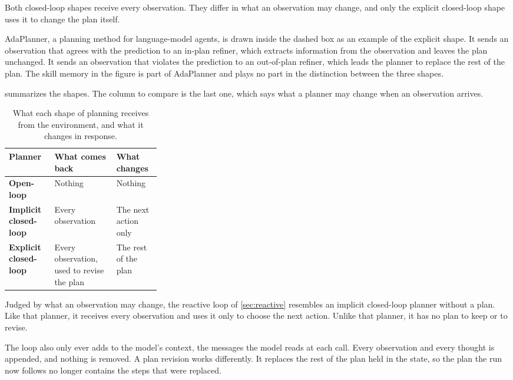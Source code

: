 Both closed-loop shapes receive every observation. They differ in what an observation may change,
and only the explicit closed-loop shape uses it to change the plan itself.

AdaPlanner, a planning method for language-model agents, is drawn inside the dashed box as an example
of the explicit shape. It sends an observation that agrees with the prediction to an in-plan refiner,
which extracts information from the observation and leaves the plan unchanged. It sends an
observation that violates the prediction to an out-of-plan refiner, which leads the planner to
replace the rest of the plan. The skill memory in the figure is part of AdaPlanner and plays no part
in the distinction between the three shapes.

 summarizes the shapes. The column to compare is the last one, which says
what a planner may change when an observation arrives.

\begin{table}[htbp]
  \caption{What each shape of planning receives from the environment, and what it changes in
  response.}
  \label{tab:planning-shapes}
  \begin{adjustbox}{width=\linewidth}\begin{tabularx}{\linewidth}{L{0.3\linewidth}XX}
    \toprule
    \textbf{Planner} & \textbf{What comes back} & \textbf{What changes} \\
    \midrule
    \textbf{Open-loop} & Nothing & Nothing \\ \addlinespace
    \textbf{Implicit closed-loop} & Every observation & The next action only \\ \addlinespace
    \textbf{Explicit closed-loop} & Every observation, used to revise the plan & The rest of the
      plan \\
    \bottomrule
  \end{tabularx}\end{adjustbox}
\end{table}

Judged by what an observation may change, the reactive loop of \cref{sec:reactive} resembles an
implicit closed-loop planner without a plan. Like that planner, it receives every observation and
uses it only to choose the next action. Unlike that planner, it has no plan to keep or to revise.

The loop also only ever adds to the model's context, the messages the model reads at each call.
Every observation and every thought is appended, and nothing is removed. A plan revision works
differently. It replaces the rest of the plan held in the state, so the plan the run now follows no
longer contains the steps that were replaced.

